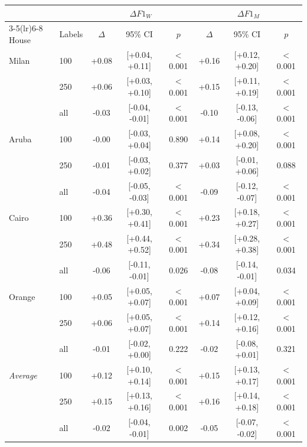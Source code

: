 \begin{tabular}{l l ccc ccc}
\toprule
 & & \multicolumn{3}{c}{$\Delta F1_W$} & \multicolumn{3}{c}{$\Delta F1_M$} \\
\cmidrule(lr){3-5}\cmidrule(lr){6-8}
House & Labels & $\Delta$ & 95\% CI & $p$ & $\Delta$ & 95\% CI & $p$ \\
\midrule
Milan & 100 & +0.08 & [+0.04, +0.11] & $<$0.001 & +0.16 & [+0.12, +0.20] & $<$0.001 \\
 & 250 & +0.06 & [+0.03, +0.10] & $<$0.001 & +0.15 & [+0.11, +0.19] & $<$0.001 \\
 & all & -0.03 & [-0.04, -0.01] & $<$0.001 & -0.10 & [-0.13, -0.06] & $<$0.001 \\
\midrule
Aruba & 100 & -0.00 & [-0.03, +0.04] & 0.890 & +0.14 & [+0.08, +0.20] & $<$0.001 \\
 & 250 & -0.01 & [-0.03, +0.02] & 0.377 & +0.03 & [-0.01, +0.06] & 0.088 \\
 & all & -0.04 & [-0.05, -0.03] & $<$0.001 & -0.09 & [-0.12, -0.07] & $<$0.001 \\
\midrule
Cairo & 100 & +0.36 & [+0.30, +0.41] & $<$0.001 & +0.23 & [+0.18, +0.27] & $<$0.001 \\
 & 250 & +0.48 & [+0.44, +0.52] & $<$0.001 & +0.34 & [+0.28, +0.38] & $<$0.001 \\
 & all & -0.06 & [-0.11, -0.01] & 0.026 & -0.08 & [-0.14, -0.01] & 0.034 \\
\midrule
Orange & 100 & +0.05 & [+0.05, +0.07] & $<$0.001 & +0.07 & [+0.04, +0.09] & $<$0.001 \\
 & 250 & +0.06 & [+0.05, +0.07] & $<$0.001 & +0.14 & [+0.12, +0.16] & $<$0.001 \\
 & all & -0.01 & [-0.02, +0.00] & 0.222 & -0.02 & [-0.08, +0.01] & 0.321 \\
\midrule
\textit{Average} & 100 & +0.12 & [+0.10, +0.14] & $<$0.001 & +0.15 & [+0.13, +0.17] & $<$0.001 \\
 & 250 & +0.15 & [+0.13, +0.16] & $<$0.001 & +0.16 & [+0.14, +0.18] & $<$0.001 \\
 & all & -0.02 & [-0.04, -0.01] & 0.002 & -0.05 & [-0.07, -0.02] & $<$0.001 \\
\bottomrule
\end{tabular}
